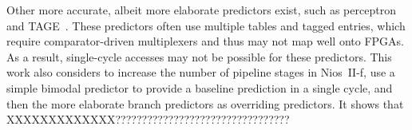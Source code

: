 Other more accurate, albeit more elaborate predictors exist, such as perceptron~\cite{perceptron} and TAGE~\cite{tage}. These predictors often use multiple tables and tagged entries, which require comparator-driven multiplexers and thus may not map well onto FPGAs. As a result, single-cycle accesses may not be possible for these predictors. This work also considers to increase the number of pipeline stages in Nios~II-f, use a simple bimodal predictor to provide a baseline prediction in a single cycle, and then the more elaborate branch predictors as overriding predictors. It shows that XXXXXXXXXXXXX????????????????????????????????? 

